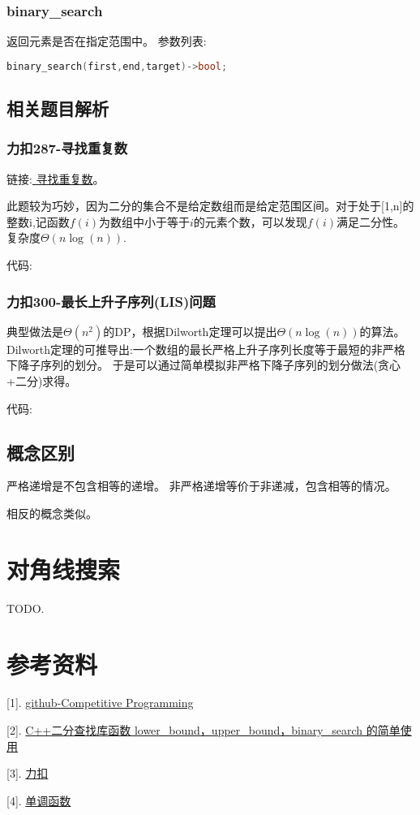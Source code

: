 \documentclass{article}
\begin{document}
    \subsubsection{binary\_search}
    返回元素是否在指定范围中。
    参数列表:
    \begin{lstlisting}[language=c++]
        binary_search(first,end,target)->bool;
    \end{lstlisting}

    \subsection{相关题目解析}
    \subsubsection{力扣287-寻找重复数}
    链接:\href{https://leetcode.cn/problems/find-the-duplicate-number/}{ 寻找重复数}。

    此题较为巧妙，因为二分的集合不是给定数组而是给定范围区间。对于处于[1,n]的整数i,记函数$f(i)$为数组中小于等于$i$的元素个数，可以发现$f(i)$满足二分性。复杂度$\Theta(n\log(n))$.

    代码:

    

    \subsubsection{力扣300-最长上升子序列(LIS)问题}
    典型做法是$\Theta(n^2)$的DP，根据Dilworth定理可以提出$\Theta(n\log(n))$的算法。
    Dilworth定理的可推导出:一个数组的最长严格上升子序列长度等于最短的非严格下降子序列的划分。
    于是可以通过简单模拟非严格下降子序列的划分做法(贪心+二分)求得。

    代码:
    
    

    \subsection{概念区别}
    严格递增是不包含相等的递增。
    非严格递增等价于非递减，包含相等的情况。
    
    相反的概念类似。

    \section{对角线搜索}
    TODO.

    \section*{参考资料}

    [1]. \href{https://github.com/JatinDholakia/Competitive-Programming}{github-Competitive Programming}

    [2]. \href{https://blog.csdn.net/weixin_44176696/article/details/104200660}{C++二分查找库函数 lower\_bound，upper\_bound，binary\_search 的简单使用}

    [3]. \href{https://leetcode.cn/}{力扣}

    [4]. \href{https://www.wikiwand.com/zh-sg/%E5%8D%95%E8%B0%83%E5%87%BD%E6%95%B0}{单调函数}
\end{document}
